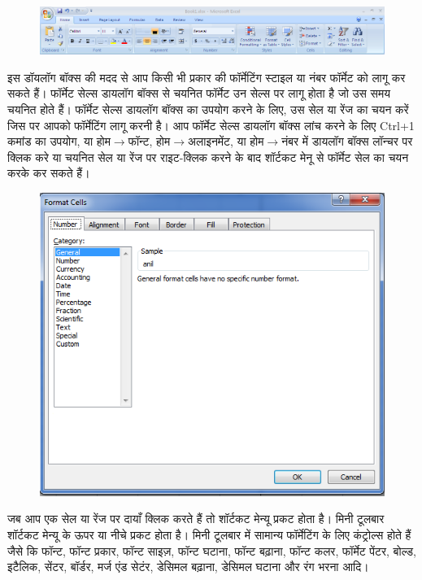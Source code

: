 \begin{figure}[H]
\centering
\includegraphics[scale=0.38]{src/images/chapter2/chapter2_fig01.png}
\end{figure}



इस डॉयलॉग बॉक्स की मदद से आप किसी भी प्रकार की फॉर्मेटिंग स्टाइल या नंबर फॉर्मेट को लागू कर सकते हैं। फॉर्मेट सेल्स डायलॉग बॉक्स से चयनित फॉर्मेट उन सेल्स पर लागू होता है जो उस समय चयनित होते हैं। फॉर्मेट सेल्स डायलॉग बॉक्स का उपयोग करने के लिए, उस सेल या रेंज का चयन करें जिस पर आपको फॉर्मेटिंग लागू करनी है। आप फॉर्मेट सेल्स डायलॉग बॉक्स लांच करने के लिए Ctrl+1 कमांड का उपयोग, या होम$\to$फॉन्ट, होम$\to$अलाइनमेंट, या होम$\to$नंबर में डायलॉग बॉक्स लॉन्चर पर क्लिक करे या चयनित सेल या रेंज पर राइट-क्लिक करने के बाद शॉर्टकट मेनू से फॉर्मेट सेल का चयन करके कर सकते हैं।
\begin{figure}[H]
\centering
\includegraphics[scale=0.42]{src/images/chapter2/chapter2_fig02.png}
\end{figure}


जब आप एक सेल या रेंज पर दायाँ क्लिक करते हैं तो शॉर्टकट मेन्यू प्रकट होता है। मिनी टूलबार शॉर्टकट मेन्यू के ऊपर या नीचे प्रकट होता है। मिनी टूलबार में सामान्य फॉर्मेटिंग के लिए कंट्रोल्स होते हैं जैसे कि फॉन्ट, फॉन्ट प्रकार, फॉन्ट साइज़, फॉन्ट घटाना, फॉन्ट बढ़ाना, फॉन्ट कलर, फॉर्मेट पेंटर, बोल्ड, इटैलिक, सेंटर, बॉर्डर, मर्ज एंड सेटंर, डेसिमल बढ़ाना, डेसिमल घटाना और रंग भरना आदि।
\newpage

